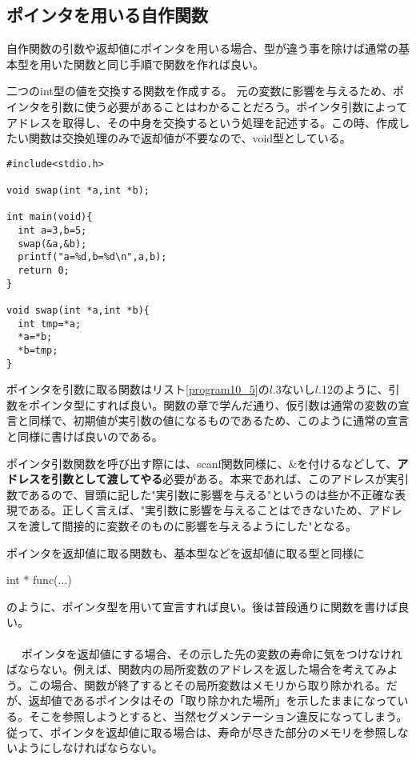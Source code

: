 \subsection{ポインタを用いる自作関数}
自作関数の引数や返却値にポインタを用いる場合、型が違う事を除けば通常の基本型を用いた関数と同じ手順で関数を作れば良い。
\begin{boxnote}
\begin{multicols}{2}
二つのint型の値を交換する関数を作成する。
元の変数に影響を与えるため、ポインタを引数に使う必要があることはわかることだろう。ポインタ引数によってアドレスを取得し、その中身を交換するという処理を記述する。この時、作成したい関数は交換処理のみで返却値が不要なので、void型としている。
\begin{lstlisting}[caption=交換を行う関数,label=program10_5]
#include<stdio.h>

void swap(int *a,int *b);

int main(void){
  int a=3,b=5;
  swap(&a,&b);
  printf("a=%d,b=%d\n",a,b);
  return 0;
}

void swap(int *a,int *b){
  int tmp=*a;
  *a=*b;
  *b=tmp;
}
\end{lstlisting}
\end{multicols}
\end{boxnote}

ポインタを引数に取る関数はリスト\ref{program10_5}の$l$.3ないし$l$.12のように、引数をポインタ型にすれば良い。関数の章で学んだ通り、仮引数は通常の変数の宣言と同様で、初期値が実引数の値になるものであるため、このように通常の宣言と同様に書けば良いのである。

ポインタ引数関数を呼び出す際には、scanf関数同様に、\&を付けるなどして、\textbf{アドレスを引数として渡してやる}必要がある。本来であれば、このアドレスが実引数であるので、冒頭に記した"実引数に影響を与える"というのは些か不正確な表現である。正しく言えば、"実引数に影響を与えることはできないため、アドレスを渡して間接的に変数そのものに影響を与えるようにした"となる。

ポインタを返却値に取る関数も、基本型などを返却値に取る型と同様に
\begin{code}
int * func(...)
\end{code}
のように、ポインタ型を用いて宣言すれば良い。後は普段通りに関数を書けば良い。
\\ \\　
ポインタを返却値にする場合、その示した先の変数の寿命に気をつけなければならない。例えば、関数内の局所変数のアドレスを返した場合を考えてみよう。この場合、関数が終了するとその局所変数はメモリから取り除かれる。だが、返却値であるポインタはその「取り除かれた場所」を示したままになっている。そこを参照しようとすると、当然セグメンテーション違反になってしまう。従って、ポインタを返却値に取る場合は、寿命が尽きた部分のメモリを参照しないようにしなければならない。

